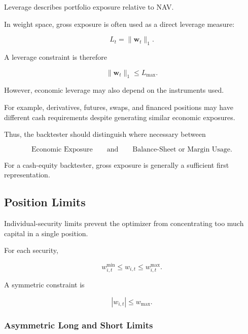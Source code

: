 \documentclass[11pt,a4paper]{article}
\begin{document}
Leverage describes portfolio exposure relative to NAV.

In weight space, gross exposure is often used as a direct leverage measure:

\begin{equation}
\boxed{
L_t
=
\|\mathbf{w}_t\|_1.
}
\end{equation}

A leverage constraint is therefore

\begin{equation}
\boxed{
\|\mathbf{w}_t\|_1
\leq
L_{\max}.
}
\end{equation}

However, economic leverage may also depend on the instruments used.

For example, derivatives, futures, swaps, and financed positions may have
different cash requirements despite generating similar economic exposures.

Thus, the backtester should distinguish where necessary between

\begin{equation}
\boxed{
\text{Economic Exposure}
\qquad\text{and}\qquad
\text{Balance-Sheet or Margin Usage}.
}
\end{equation}

For a cash-equity backtester, gross exposure is generally a sufficient first
representation.


\subsection{Position Limits}
\label{subsec:position_limits}

Individual-security limits prevent the optimizer from concentrating too much
capital in a single position.

For each security,

\begin{equation}
\boxed{
w_{i,t}^{\min}
\leq
w_{i,t}
\leq
w_{i,t}^{\max}.
}
\end{equation}

A symmetric constraint is

\begin{equation}
\boxed{
|w_{i,t}|
\leq
w_{\max}.
}
\end{equation}


\subsubsection{Asymmetric Long and Short Limits}
\end{document}
